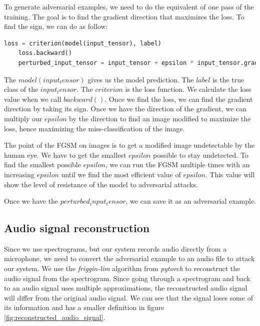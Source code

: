 To generate adversarial examples, we need to do the equivalent of one pass of the training. The goal is to find the gradient direction that maximizes the loss. To find the sign, we can do as follow:

\begin{lstlisting}[language=Python]
    loss = criterion(model(input_tensor), label)
    loss.backward()
    perturbed_input_tensor = input_tensor + epsilon * input_tensor.grad.sign()
\end{lstlisting}

The $model(input_tensor)$ gives us the model prediction. The $label$ is the true class of the $input_tensor$. The $criterion$ is the loss function. We calculate the loss value when we call $backward()$. Once we find the loss, we can find the gradient direction by taking its sign. Once we have the direction of the gradient, we can multiply our $epsilon$ by the direction to find an image modified to maximize the loss, hence maximizing the miss-classification of the image.

The point of the FGSM on images is to get a modified image undetectable by the human eye. We have to get the smallest $epsilon$ possible to stay undetected. To find the smallest possible $epsilon$, we can run the FGSM multiple times with an increasing $epsilon$ until we find the most efficient value of $epsilon$. This value will show the level of resistance of the model to adversarial attacks.

Once we have the $perturbed_input_tensor$, we can save it as an adversarial example.

\subsection{Audio signal reconstruction}

Since we use spectrograms, but our system records audio directly from a microphone, we need to convert the adversarial example to an audio file to attack our system. We use the \textit{friggin-lim} algorithm from \textit{pytorch} to reconstruct the audio signal from the spectrogram. Since going through a spectrogram and back to an audio signal uses multiple approximations, the reconstructed audio signal will differ from the original audio signal. We can see that the signal loses some of its information and has a smaller definition in figure \ref{fig:reconstructed_audio_signal}.

